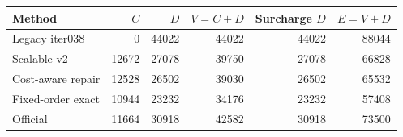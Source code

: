 \begin{tabular}{lrrrrr}
\toprule
Method & $C$ & $D$ & $V=C+D$ & Surcharge $D$ & $E=V+D$ \\
\midrule
Legacy iter038 & 0 & 44022 & 44022 & 44022 & 88044 \\
Scalable v2 & 12672 & 27078 & 39750 & 27078 & 66828 \\
Cost-aware repair & 12528 & 26502 & 39030 & 26502 & 65532 \\
Fixed-order exact & 10944 & 23232 & 34176 & 23232 & 57408 \\
Official & 11664 & 30918 & 42582 & 30918 & 73500 \\
\bottomrule
\end{tabular}
